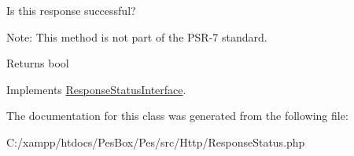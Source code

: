 Is this response successful?

Note\+: This method is not part of the P\+S\+R-\/7 standard.

\begin{DoxyReturn}{Returns}
bool 
\end{DoxyReturn}


Implements \mbox{\hyperlink{interface_pes_1_1_http_1_1_response_status_interface_ac9309d8cf733cca95b953596caeb3969}{Response\+Status\+Interface}}.



The documentation for this class was generated from the following file\+:\begin{DoxyCompactItemize}
\item 
C\+:/xampp/htdocs/\+Pes\+Box/\+Pes/src/\+Http/Response\+Status.\+php\end{DoxyCompactItemize}
